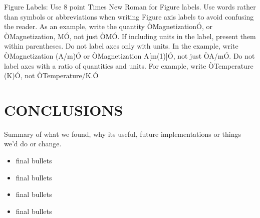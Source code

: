 \documentclass[letterpaper, 10 pt, conference]{ieeeconf}  %
\begin{document}
Figure Labels: Use 8 point Times New Roman for Figure labels. Use words rather than symbols or abbreviations when writing Figure axis labels to avoid confusing the reader. As an example, write the quantity ÒMagnetizationÓ, or ÒMagnetization, MÓ, not just ÒMÓ. If including units in the label, present them within parentheses. Do not label axes only with units. In the example, write ÒMagnetization (A/m)Ó or ÒMagnetization {A[m(1)]}Ó, not just ÒA/mÓ. Do not label axes with a ratio of quantities and units. For example, write ÒTemperature (K)Ó, not ÒTemperature/K.Ó


\section{CONCLUSIONS}

Summary of what we found, why its useful, future implementations or things we'd do or change.

\begin{itemize}

\item final bullets 
\item final bullets 
\item final bullets 
\item final bullets 
\end{itemize}

\addtolength{\textheight}{-12cm}   %







\end{document}
